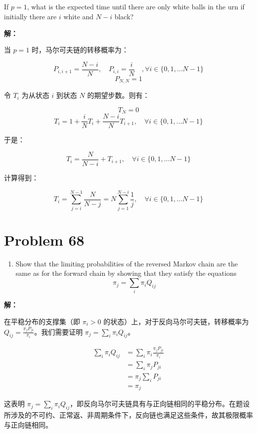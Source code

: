 \documentclass[12pt,a4paper]{article}
\begin{document}
\subsection{}

If $p = 1$, what is the expected time until there are only white balls in the urn if initially there are $i$ white and $N - i$ black?

\begin{answerbox}
\textbf{解：}

当 $p=1$ 时，马尔可夫链的转移概率为：

$$
P_{i, i+1} = \frac{N-i}{N}, \quad P_{i, i} = \frac{i}{N} \quad ,\forall i \in \{0, 1, \ldots N-1\}
$$
$$
P_{N, N} = 1
$$

令 $T_i$ 为从状态 $i$ 到状态 $N$ 的期望步数。则有：

$$
T_N = 0
$$
$$
T_i=1+\frac{i}{N}T_i + \frac{N-i}{N}T_{i+1}, \quad \forall i \in \{0, 1, \ldots N-1\}
$$

于是：

$$
T_i = \frac{N}{N-i} + T_{i+1}, \quad \forall i \in \{0, 1, \ldots N-1\}
$$

计算得到：

$$
T_i = \sum_{j=i}^{N-1} \frac{N}{N-j} = N\sum_{j=1}^{N-i} \frac{1}{j}, \quad \forall i \in \{0, 1, \ldots N-1\}
$$

\end{answerbox}

\section*{Problem 68}

\begin{enumerate}[label=(\alph*), leftmargin=2.5em]
  \item Show that the limiting probabilities of the reversed Markov chain are the same as for the forward chain by showing that they satisfy the equations
  $$
    \pi_j = \sum_i \pi_i Q_{ij}
  $$
\end{enumerate}

\begin{answerbox}
\textbf{解：}

在平稳分布的支撑集（即 $\pi_i>0$ 的状态）上，对于反向马尔可夫链，转移概率为 $Q_{ij} = \frac{\pi_j P_{ji}}{\pi_i}$。我们需要证明 $\pi_j = \sum_i \pi_i Q_{ij}$。

\begin{align*}
\sum_i \pi_i Q_{ij} &= \sum_i \pi_i \frac{\pi_j P_{ji}}{\pi_i} \\
&= \sum_i \pi_j P_{ji} \\
&= \pi_j \sum_i P_{ji} \\
&= \pi_j
\end{align*}

这表明 $\pi_j = \sum_i \pi_i Q_{ij}$，即反向马尔可夫链具有与正向链相同的平稳分布。在题设所涉及的不可约、正常返、非周期条件下，反向链也满足这些条件，故其极限概率与正向链相同。

\end{answerbox}
\end{document}
